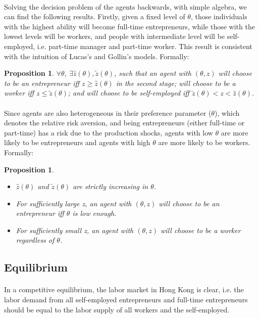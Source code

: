 \documentclass[12pt]{article}
\newtheorem{proposition}[theorem]{Proposition}
\begin{document}
\paragraph{}
Solving the decision problem of the agents backwards, with simple algebra, we can find the following results. Firstly, given a fixed level of $\theta$, those individuals with the highest ability will become full-time entrepreneurs, while those with the lowest levels will be workers, and people with intermediate level will be self-employed, i.e. part-time manager and part-time worker. This result is consistent with the intuition of Lucas's and Gollin's models. Formally:
\begin{proposition}
 $\forall \theta$, $\exists \hat{z}(\theta), \tilde{z}(\theta)$, such that an agent with $(\theta, z)$ will choose to be an entrepreneur iff $z \geq \hat{z}(\theta)$ in the second stage; will choose to be a worker iff $z \leq \tilde{z}(\theta)$; and will choose to be self-employed iff $\tilde{z}(\theta)<z<\hat{z}(\theta)$.
\end{proposition}

\paragraph{}
Since agents are also heterogeneous in their preference parameter ($\theta$), which denotes the relative risk aversion, and being entrepreneurs (either full-time or part-time) has a risk due to the production shocks, agents with low $\theta$ are more likely to be entrepreneurs and agents with high $\theta$ are more likely to be workers. Formally:
\begin{proposition}
\begin{itemize}
\item $\hat{z}(\theta)$ and $\tilde{z}(\theta)$ are strictly increasing in $\theta$. 
\item For sufficiently large z,  an agent with $(\theta, z)$ will choose to be an entrepreneur iff $\theta$ is low enough.
\item For sufficiently small z, an agent with $(\theta, z)$ will choose to be a worker regardless of $\theta$.
\end{itemize}
\end{proposition}
\bigskip

\subsection{Equilibrium}
\paragraph{}
In a competitive equilibrium, the labor market in Hong Kong is clear, i.e. the labor demand from all self-employed entrepreneurs and full-time entrepreneurs should be equal to the labor supply of all workers and the self-employed. 
\end{document}
